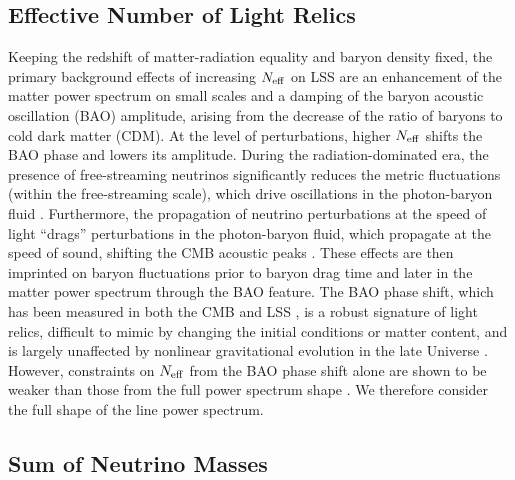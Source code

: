 \documentclass[twocolumn]{aastex631}
\begin{document}
\subsection{Effective Number of Light Relics}

Keeping the redshift of matter-radiation equality and baryon density fixed, the primary background effects of increasing $N_{\rm eff}$ on LSS are an enhancement of the matter power spectrum on small scales and a damping of the baryon acoustic oscillation (BAO) amplitude, arising from the decrease of the ratio of baryons to cold dark matter (CDM). At the level of perturbations, higher $N_{\rm eff}$ shifts the BAO phase and lowers its amplitude. During the radiation-dominated era, the presence of free-streaming neutrinos significantly reduces the metric fluctuations (within the free-streaming scale), which drive oscillations in the photon-baryon fluid \citep{Hu:1995en}. Furthermore, the propagation of neutrino perturbations at the speed of light ``drags'' perturbations in the photon-baryon fluid, which propagate at the speed of sound, shifting the CMB acoustic peaks \citep{Bashinsky:2003tk}. These effects are then imprinted on baryon fluctuations prior to baryon drag time and later in the matter power spectrum through the BAO feature. The BAO phase shift, which has been measured in both the CMB and LSS \citep{Follin:2015hya, Baumann:2018qnt}, is a robust signature of light relics, difficult to mimic by changing the initial conditions or matter content, and is largely unaffected by nonlinear gravitational evolution in the late Universe \citep{Baumann:2017lmt}. However, constraints on $N_{\rm eff}$ from the BAO phase shift alone are shown to be weaker than those from the full power spectrum shape \citep{Baumann:2017gkg}. We therefore consider the full shape of the line power spectrum. 

\subsection{Sum of Neutrino Masses}
\end{document}

